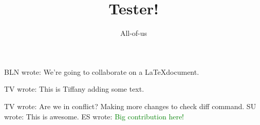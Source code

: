 \documentclass[12pt]{article}
\title{Tester!}
\author{All-of-us}
\newcommand{\bln}[1]{BLN wrote: \textcolor{red!70!blue!70}{#1}}
\newcommand{\tv}[1]{TV wrote: \textcolor{blue!70}{#1}}
\newcommand{\su}[1]{SU wrote: \textcolor{green!70}{#1}}
\newcommand{\es}[1]{ES wrote: \textcolor{green}{#1}}
\begin{document}
\maketitle

\bln{We're going to collaborate on a \LaTeX document.}

\tv{This is Tiffany adding some text.}

\tv{Are we in conflict? Making more changes to check diff command.}
\su{This is awesome.}
\es{Big contribution here!}
\end{document}
